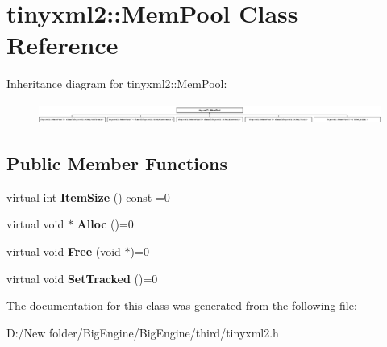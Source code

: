 \hypertarget{classtinyxml2_1_1_mem_pool}{}\section{tinyxml2\+:\+:Mem\+Pool Class Reference}
\label{classtinyxml2_1_1_mem_pool}
Inheritance diagram for tinyxml2\+:\+:Mem\+Pool\+:\begin{figure}[H]
\begin{center}
\leavevmode
\includegraphics[height=0.691358cm]{classtinyxml2_1_1_mem_pool}
\end{center}
\end{figure}
\subsection*{Public Member Functions}
\begin{DoxyCompactItemize}
\item 
\mbox{\label{classtinyxml2_1_1_mem_pool_a0c518d49e3a94bde566f61e13b7240bb}} 
virtual int {\bfseries Item\+Size} () const =0
\item 
\mbox{\label{classtinyxml2_1_1_mem_pool_a4f977b5fed752c0bbfe5295f469d6449}} 
virtual void $\ast$ {\bfseries Alloc} ()=0
\item 
\mbox{\label{classtinyxml2_1_1_mem_pool_a49e3bfac2cba2ebd6776b31e571f64f7}} 
virtual void {\bfseries Free} (void $\ast$)=0
\item 
\mbox{\label{classtinyxml2_1_1_mem_pool_ac5804dd1387b2e4de5eef710076a0db1}} 
virtual void {\bfseries Set\+Tracked} ()=0
\end{DoxyCompactItemize}


The documentation for this class was generated from the following file\+:\begin{DoxyCompactItemize}
\item 
D\+:/\+New folder/\+Big\+Engine/\+Big\+Engine/third/tinyxml2.\+h\end{DoxyCompactItemize}
